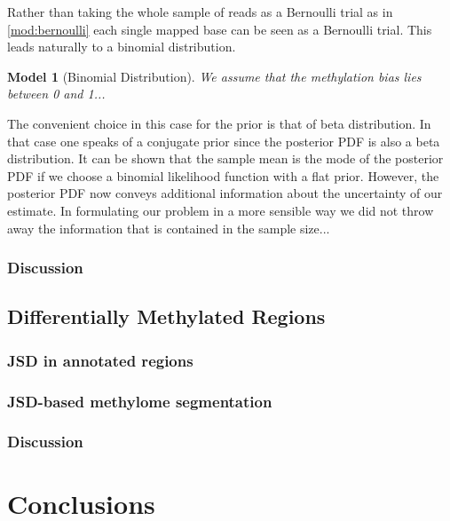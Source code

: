 \documentclass[a4paper]{article}
\newtheorem{model}{Model}
\begin{document}
Rather than taking the whole sample of reads as a Bernoulli trial as
in \ref{mod:bernoulli} each single mapped base can be seen as a
Bernoulli trial. This leads naturally to a binomial distribution.
\begin{model}[Binomial Distribution]\label{mod:binomial}
We assume that the methylation bias lies between 0 and 1...
\end{model}
The convenient choice in this case for the prior is that of beta
distribution. In that case one speaks of a conjugate prior since the
posterior PDF is also a beta distribution. It can be shown that the
sample mean is the mode of the posterior PDF if we choose a binomial
likelihood function with a flat prior. However, the posterior PDF now
conveys additional information about the uncertainty of our estimate.
In formulating our problem in a more sensible way we did not throw
away the information that is contained in the sample size...

\subsubsection{Discussion}
\label{sec:dmp-discussion}

\subsection{Differentially Methylated Regions}
\label{sec:dmr}

\subsubsection{JSD in annotated regions}
\label{sec:dmr-annotated}

\subsubsection{JSD-based methylome segmentation}
\label{sec:dmr-segmentation}

\subsubsection{Discussion}
\label{sec:dmr-discussion}

\section{Conclusions}
\label{sec:conclusions}

\printbibliography
\end{document}
